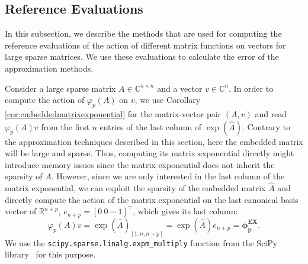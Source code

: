 \subsection{Reference Evaluations}
\label{sec:exactevaluation}

In this subsection, we describe the methods that are used for computing the reference
evaluations of the action of different matrix functions on vectors for large sparse matrices.
We use these evaluations to calculate the error of the approximation methods.

Consider a large sparse matrix $A \in \mathbb{C}^{n \times n}$ and a vector $v \in \mathbb{C}^n$.
In order to compute the action of $\varphi_p(A)$ on $v$, we use Corollary
\ref{cor:embeddedmatrixexponential} for the matrix-vector pair $(A, v)$ and
read $\varphi_p(A) v$ from the first $n$ entries of the last column of $\exp(\hat{A})$.
Contrary to the approximation techniques described in this section, here the embedded
matrix will be large and sparse.
Thus, computing its matrix exponential directly might introduce memory issues
since the matrix exponential does not inherit the sparsity of $A$.
However, since we are only interested in the last column of the matrix exponential,
we can exploit the sparsity of the embedded matrix $\hat{A}$ and directly compute
the action of the matrix exponential on the last canonical basis vector of $\mathbb{R}^{n+p}$,
$e_{n+p} = [0\:0\:\cdots\:1]^\top$, which gives its last column:
\begin{equation*}
    \varphi_p(A) v = \exp(\hat{A})_{[1 : n, n+p]} = \exp(\hat{A}) e_{n+p} = \mathbf{\phi_{p}^{EX}}.
\end{equation*}
We use the \texttt{scipy.sparse.linalg.expm\_multiply} function from
the SciPy library~\cite{SciPy2020} for this purpose.

